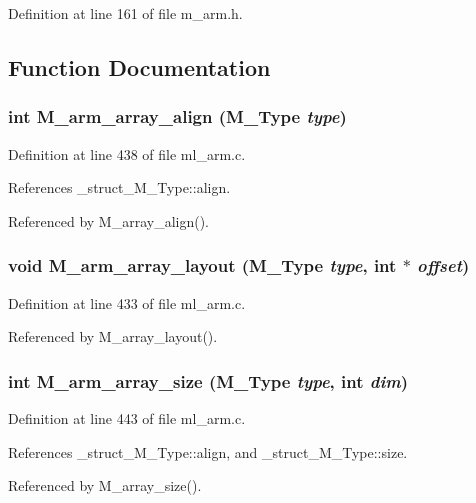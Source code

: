 Definition at line 161 of file m\_\-arm.h.

\subsection{Function Documentation}
\subsubsection{\setlength{\rightskip}{0pt plus 5cm}int M\_\-arm\_\-array\_\-align (\bf{M\_\-Type} {\em type})}\label{m__arm_8h_4e8f6b62ddef8e5d52ef23d7e70c649a}




Definition at line 438 of file ml\_\-arm.c.

References \_\-struct\_\-M\_\-Type::align.

Referenced by M\_\-array\_\-align().
\subsubsection{\setlength{\rightskip}{0pt plus 5cm}void M\_\-arm\_\-array\_\-layout (\bf{M\_\-Type} {\em type}, int $\ast$ {\em offset})}\label{m__arm_8h_af6e70a2ab899b8b7ee98e42197f6930}




Definition at line 433 of file ml\_\-arm.c.

Referenced by M\_\-array\_\-layout().
\subsubsection{\setlength{\rightskip}{0pt plus 5cm}int M\_\-arm\_\-array\_\-size (\bf{M\_\-Type} {\em type}, int {\em dim})}\label{m__arm_8h_c0d585bf88b2f02e7dcf5f7dba236a0f}




Definition at line 443 of file ml\_\-arm.c.

References \_\-struct\_\-M\_\-Type::align, and \_\-struct\_\-M\_\-Type::size.

Referenced by M\_\-array\_\-size().
